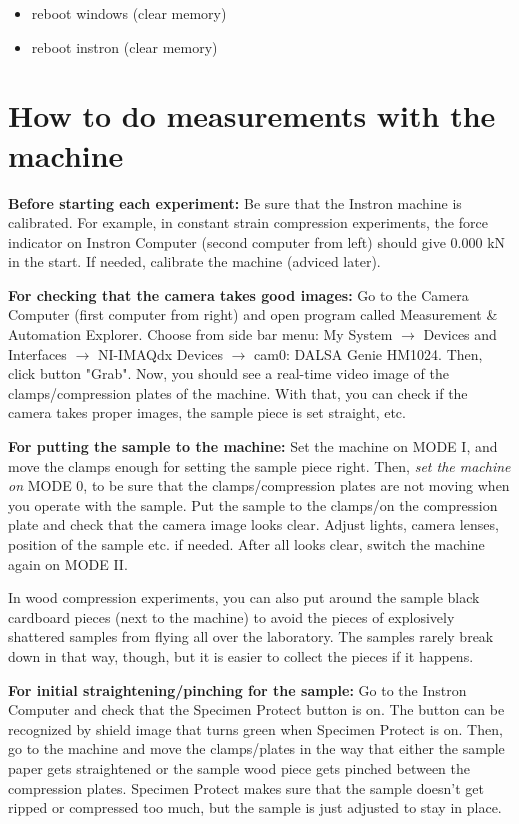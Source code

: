 \documentclass[a4paper]{article}
\begin{document}
\begin{itemize}
	\item reboot windows (clear memory)
  \item reboot instron (clear memory)
\end{itemize}

\section{How to do measurements with the machine}

\textbf{Before starting each experiment:} Be sure that the Instron machine
is calibrated. For example, in constant strain compression experiments, 
the force indicator on Instron Computer (second computer from left) should 
give 0.000 kN in the start. If needed, calibrate the machine (adviced later).

\textbf{For checking that the camera takes good images:} Go to the Camera 
Computer (first computer from right) and open program called Measurement 
\& Automation Explorer. Choose from side bar menu: My System $\rightarrow$ 
Devices and Interfaces $\rightarrow$ NI-IMAQdx Devices $\rightarrow$ cam0: 
DALSA Genie HM1024. Then, click button "Grab". Now, you should see a real-time 
video image of the clamps/compression plates of the machine. With that, you 
can check if the camera takes proper images, the sample piece is set straight, 
etc.

\textbf{For putting the sample to the machine:} Set the machine on \textsf{MODE I}, 
and move the clamps enough for setting the sample piece right. Then, \emph{set 
the machine on} \textsf{MODE 0}, to be sure that the clamps/compression plates 
are not moving when you operate with the sample. Put the sample to the clamps/on 
the compression plate and check that the camera image looks clear. Adjust lights, 
camera lenses, position of the sample etc. if needed. After all looks clear, 
switch the machine again on \textsf{MODE II}. 

In wood compression experiments, you can also put around the sample black cardboard 
pieces (next to the machine) to avoid the pieces of explosively shattered samples 
from flying all over the laboratory. The samples rarely break down in that way, 
though, but it is easier to collect the pieces if it happens.

\textbf{For initial straightening/pinching for the sample:} Go to the Instron 
Computer and check that the Specimen Protect button is on. The button can be 
recognized by shield image that turns green when Specimen Protect is on. Then, 
go to the machine and move the clamps/plates in the way that either the sample 
paper gets straightened or the sample wood piece gets pinched between the 
compression plates. Specimen Protect makes sure that the sample doesn't get 
ripped or compressed too much, but the sample is just adjusted to stay in place.
\end{document}
